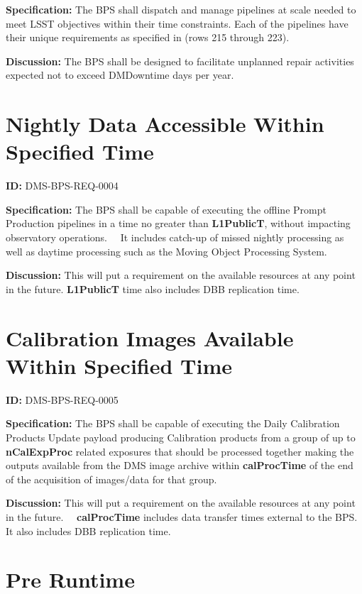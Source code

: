 \documentclass[SE,toc]{lsstdoc}
\begin{document}
\textbf{Specification:}
The BPS shall dispatch and manage pipelines at scale needed to meet LSST objectives within their time constraints. Each of the pipelines have their unique requirements as specified in  (rows 215 through 223).

\textbf{Discussion:}
The BPS shall be designed to facilitate unplanned repair activities expected not to exceed DMDowntime days per year.

\section{Nightly Data Accessible Within Specified Time}

\label{DMS-BPS-REQ-0004}
\textbf{ID:} DMS-BPS-REQ-0004

\textbf{Specification:}
The BPS shall be capable of executing the offline Prompt Production pipelines in a time no greater than \textbf{L1PublicT}, without impacting observatory operations.   It includes catch-up of missed nightly processing as well as daytime processing such as the Moving Object Processing System.

\textbf{Discussion:}
This will put a requirement on the available resources at any point in the future. \textbf{L1PublicT} time also includes DBB replication time.

\section{Calibration Images Available Within Specified Time}

\label{DMS-BPS-REQ-0005}
\textbf{ID:} DMS-BPS-REQ-0005

\textbf{Specification:}
The BPS shall be capable of executing the Daily Calibration Products Update payload producing Calibration products from a group of up to \textbf{nCalExpProc} related exposures that should be processed together making the outputs available from the DMS image archive within \textbf{calProcTime} of the end of the acquisition of images/data for that group.

\textbf{Discussion:}
This will put a requirement on the available resources at any point in the future.   \textbf{calProcTime} includes data transfer times external to the BPS. It also includes DBB replication time.

\section{Pre Runtime}
\end{document}
